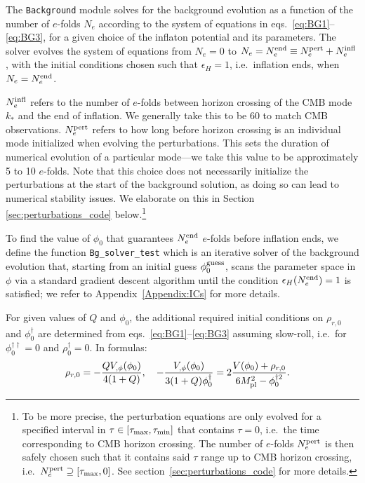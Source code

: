 \documentclass[a4paper,11pt]{article}
\begin{document}
The \texttt{Background} module solves for the background evolution as a function of the number of $e$-folds $N_e$ according to the system of equations in eqs.~\eqref{eq:BG1}--\eqref{eq:BG3}, for a given choice of the inflaton potential and its parameters. The solver evolves the system of equations from $N_e=0$ to $N_e=N^{\rm{end}}_{e}\equiv N_e^{\rm{pert}}+N_e^{\rm{infl}}$, with the initial conditions chosen such that $\epsilon_H=1$, i.e.\ inflation ends, when $N_e=N_e^{\rm{end}}$.

$N_e^{\rm{infl}}$ refers to the number of $e$-folds between horizon crossing of the CMB mode $k_*$ and the end of inflation. We generally take this to be $60$ to match CMB observations.
$N_e^{\rm{pert}}$ refers to how long before horizon crossing is an individual mode initialized when evolving the perturbations. This sets the duration of numerical evolution of a particular mode---we take this value to be approximately 5 to 10 $e$-folds. Note that this choice does not necessarily initialize the perturbations at the start of the background solution, as doing so can lead to numerical stability issues. We elaborate on this in Section \ref{sec:perturbations_code} below.\footnote{
To be more precise, the perturbation equations are only evolved for a specified interval in $\tau \in[\tau_{\rm{max}},\tau_{\rm{min}}]$ that contains $\tau=0$, i.e.\ the time corresponding to CMB horizon crossing. The number of $e$-folds $N_e^{\rm{pert}}$ is then safely chosen such that it contains said $\tau$ range up to CMB horizon crossing, i.e.\ $N^{\rm{pert}}_e \supseteq[\tau_{\rm{max}},0]$. See section~\ref{sec:perturbations_code} for more details.
}


To find the value of $\phi_0$ that guarantees $N_e^{\rm{end}}$ $e$-folds before inflation ends, we define the function \texttt{Bg\_solver\_test} which is an iterative solver of the background evolution that, starting from an initial guess $\phi_0^{\rm{guess}}$, scans the parameter space in $\phi$ via a standard gradient descent algorithm until the condition $\epsilon_H(N_e^{\rm{end}})=1$ is satisfied; we refer to Appendix~\ref{Appendix:ICs} for more details.
 
For given values of $Q$ and $\phi_0$, the additional required initial conditions on $\rho_{r,0}$ and $\phi^\dagger_0$ are determined from eqs.~\eqref{eq:BG1}--\eqref{eq:BG3} assuming slow-roll, i.e.\ for $\phi^{\dagger\dagger}_0=0$ and $\rho^{\dagger}_0=0$. In formulas:
\begin{align}
    & \rho_{r,0}=-\frac{Q V_{,\phi}(\phi_0)}{4(1+Q)}, \quad
-\frac{V_{,\phi}(\phi_0)}{3(1+Q)\phi_0^\dagger}=2\frac{V(\phi_0)+\rho_{r,0}}{6M_{\rm{pl}}^2-\phi^{\dagger 2}_0}.
\end{align}
\end{document}
